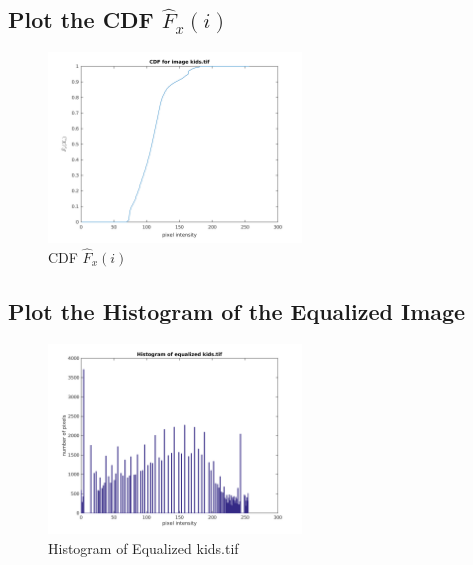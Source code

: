 \documentclass{article}
\begin{document}
\subsection{Plot the CDF $\hat{F}_x(i)$}
	\begin{figure}[h]
		\begin{center}
			\includegraphics[width=0.6\textwidth]{kids_cdf.png}
			\caption{CDF $\hat{F}_x(i)$}
		\end{center}
	\end{figure}

\subsection{Plot the Histogram of the Equalized Image}
	\begin{figure}[h]
		\begin{center}
			\includegraphics[width=0.6\textwidth]{kids_equ_hist.png}
			\caption{Histogram of Equalized kids.tif}
		\end{center}
	\end{figure}
\end{document}
